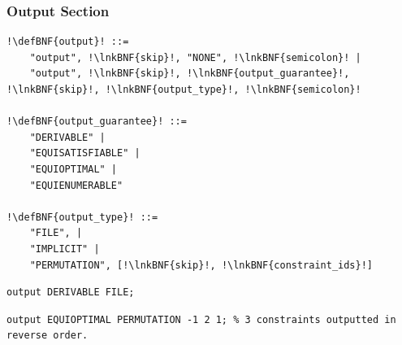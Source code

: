 \documentclass[a4paper]{article}
\newcommand{\defBNF}[1]{\hypertarget{def:#1}{<\detokenize{#1}>}}
\newcommand{\lnkBNF}[1]{\hyperlink{def:#1}{<\detokenize{#1}>}}
\begin{document}
\subsubsection{Output Section}\label{sec:footer-output}
\begin{lstlisting}
!\defBNF{output}! ::=
	"output", !\lnkBNF{skip}!, "NONE", !\lnkBNF{semicolon}! |
	"output", !\lnkBNF{skip}!, !\lnkBNF{output_guarantee}!, !\lnkBNF{skip}!, !\lnkBNF{output_type}!, !\lnkBNF{semicolon}!

!\defBNF{output_guarantee}! ::=
	"DERIVABLE" |
	"EQUISATISFIABLE" |
	"EQUIOPTIMAL" |
	"EQUIENUMERABLE"

!\defBNF{output_type}! ::=
	"FILE", |
	"IMPLICIT" |
	"PERMUTATION", [!\lnkBNF{skip}!, !\lnkBNF{constraint_ids}!]
\end{lstlisting}
\begin{lstlisting}[language=veripb]
output DERIVABLE FILE;
\end{lstlisting}
\begin{lstlisting}[language=veripb]
output EQUIOPTIMAL PERMUTATION -1 2 1; % 3 constraints outputted in reverse order.
\end{lstlisting}
\end{document}
